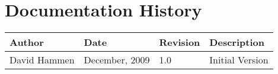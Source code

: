 
\section{Documentation History}
\begin{tabular}{||l|l|l|l|} \hline
{\bf Author } & {\bf Date} & {\bf Revision} & {\bf Description} \\ \hline \hline
 David Hammen & December, 2009 & 1.0 & Initial Version \\ \hline
\end{tabular}
